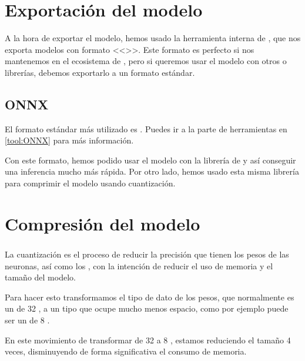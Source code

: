 
\section{Exportación del modelo}

A la hora de exportar el modelo, hemos usado la herramienta interna de , que nos exporta modelos con formato <<>>. Este formato es perfecto si nos mantenemos en el ecosistema de , pero si queremos usar el modelo con otros  o librerías, debemos exportarlo a un formato estándar.

\subsection{ONNX}

El formato estándar más utilizado es . Puedes ir a la parte de herramientas en \ref{tool:ONNX} para más información.

Con este formato, hemos podido usar el modelo con la librería de  y así conseguir una inferencia mucho más rápida. Por otro lado, hemos usado esta misma librería para comprimir el modelo usando cuantización.


\section{Compresión del modelo}

\subsubsection{}

La cuantización es el proceso de reducir la precisión que tienen los pesos de las neuronas, así como los , con la intención de reducir el uso de memoria y el tamaño del modelo.


Para hacer esto transformamos el tipo de dato de los pesos, que normalmente es un  de 32 , a un tipo que ocupe mucho menos espacio, como por ejemplo puede ser un  de 8 .

En este movimiento de transformar de 32 a 8 , estamos reduciendo el tamaño 4 veces, disminuyendo de forma significativa el consumo de memoria.

